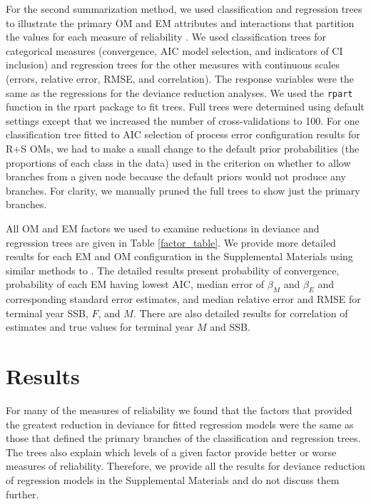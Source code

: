 \documentclass[
  12pt,
]{article}
\begin{document}
For the second summarization method, we used classification and
regression trees \citep{breimanetal84} to illustrate the primary OM and
EM attributes and interactions that partition the values for each
measure of reliability \citep[e.g.,][]{gonzalezetal18, collieretal22}.
We used classification trees for categorical measures (convergence, AIC
model selection, and indicators of CI inclusion) and regression trees
for the other measures with continuous scales (errors, relative error,
RMSE, and correlation). The response variables were the same as the
regressions for the deviance reduction analyses. We used the
\verb|rpart| function in the rpart package \citep{rpart} to fit trees.
Full trees were determined using default settings except that we
increased the number of cross-validations to 100. For one classification
tree fitted to AIC selection of process error configuration results for
R+S OMs, we had to make a small change to the default prior
probabilities (the proportions of each class in the data) used in the
criterion on whether to allow branches from a given node because the
default priors would not produce any branches. For clarity, we manually
pruned the full trees to show just the primary branches.

All OM and EM factors we used to examine reductions in deviance and
regression trees are given in Table \ref{factor_table}. We provide more
detailed results for each EM and OM configuration in the Supplemental
Materials using similar methods to \citet{milleretal26}. The detailed
results present probability of convergence, probability of each EM
having lowest AIC, median error of \(\beta_M\) and \(\beta_E\) and
corresponding standard error estimates, and median relative error and
RMSE for terminal year SSB, \(F\), and \(M\). There are also detailed
results for correlation of estimates and true values for terminal year
\(M\) and SSB.

\section*{Results}\label{results}

For many of the measures of reliability we found that the factors that
provided the greatest reduction in deviance for fitted regression models
were the same as those that defined the primary branches of the
classification and regression trees. The trees also explain which levels
of a given factor provide better or worse measures of reliability.
Therefore, we provide all the results for deviance reduction of
regression models in the Supplemental Materials and do not discuss them
further.
\end{document}
